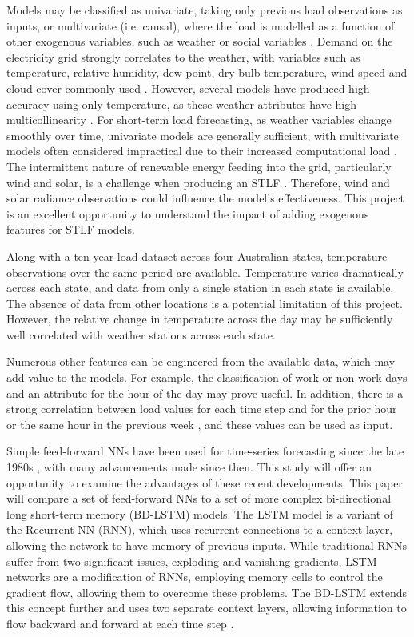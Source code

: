 \documentclass[mstat,12pt]{unswthesis}
\begin{document}
Models may be classified as univariate, taking only previous load observations as inputs, or multivariate (i.e. causal), where the load is modelled as a function of other exogenous variables, such as weather or social variables \cite{Hippert2001}. Demand on the electricity grid strongly correlates to the weather, with variables such as temperature, relative humidity, dew point, dry bulb temperature, wind speed and cloud cover commonly used \cite{Raza2015}. However, several models have produced high accuracy using only temperature, as these weather attributes have high multicollinearity \cite{Chandra2021}. For short-term load forecasting, as weather variables change smoothly over time, univariate models are generally sufficient, with multivariate models often considered impractical due to their increased computational load \cite{ElHawary2017}. The intermittent nature of renewable energy feeding into the grid, particularly wind and solar, is a challenge when producing an STLF \cite{Hoori2019}. Therefore, wind and solar radiance observations could influence the model's effectiveness. This project is an excellent opportunity to understand the impact of adding exogenous features for STLF models.

Along with a ten-year load dataset across four Australian states, temperature observations over the same period are available. Temperature varies dramatically across each state, and data from only a single station in each state is available. The absence of data from other locations is a potential limitation of this project. However, the relative change in temperature across the day may be sufficiently well correlated with weather stations across each state. 

Numerous other features can be engineered from the available data, which may add value to the models. For example, the classification of work or non-work days and an attribute for the hour of the day may prove useful. In addition, there is a strong correlation between load values for each time step and for the prior hour or the same hour in the previous week \cite{Raza2015}, and these values can be used as input.

Simple feed-forward NNs have been used for time-series forecasting since the late 1980s \cite{Czernichow1996}, with many advancements made since then. This study will offer an opportunity to examine the advantages of these recent developments. This paper will compare a set of feed-forward NNs to a set of more complex bi-directional long short-term memory (BD-LSTM) models. The LSTM model is a variant of the Recurrent NN (RNN), which uses recurrent connections to a context layer, allowing the network to have memory of previous inputs. While traditional RNNs suffer from two significant issues, exploding and vanishing gradients, LSTM networks are a modification of RNNs, employing memory cells to control the gradient flow, allowing them to overcome these problems. The BD-LSTM extends this concept further and uses two separate context layers, allowing information to flow backward and forward at each time step \cite{Chandra2021}. 
\end{document}
